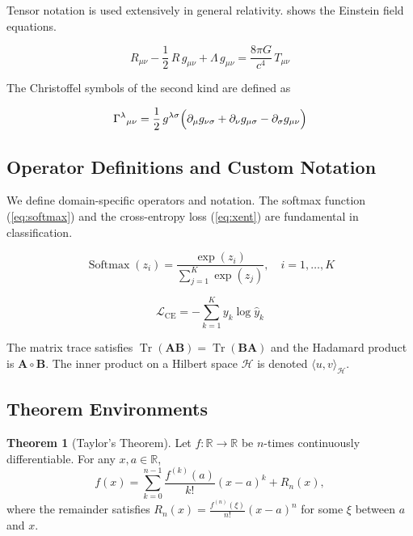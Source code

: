 \documentclass[
    language=english,
    doctype=article,
    institution=none,
    titlestyle=book,
]{../../omnilatex}
\theoremstyle{definition}
\newtheorem{theorem}{Theorem}[section]
\theoremstyle{definition}
\theoremstyle{remark}
\newcommand{\R}{\mathbb{R}}
\DeclareMathOperator{\Tr}{Tr}
\DeclareMathOperator{\Softmax}{Softmax}
\newcommand{\mat}[1]{\mathbf{#1}}
\newcommand{\hyp}{\mathcal{H}}
\newcommand{\inner}[2]{\langle #1, #2 \rangle}
\begin{document}
Tensor notation is used extensively in general relativity.
 shows the Einstein field equations.

\begin{equation}
    \label{eq:einstein}
    R_{\mu\nu} - \frac{1}{2}\,R\,g_{\mu\nu}
        + \Lambda\, g_{\mu\nu}
        = \frac{8\pi G}{c^4}\, T_{\mu\nu}
\end{equation}

The Christoffel symbols of the second kind are defined as

\begin{equation}
    \label{eq:christoffel}
    \Gamma^{\lambda}{}_{\mu\nu}
        = \frac{1}{2}\,g^{\lambda\sigma}
          \Bigl(
              \partial_\mu g_{\nu\sigma}
              + \partial_\nu g_{\mu\sigma}
              - \partial_\sigma g_{\mu\nu}
          \Bigr)
\end{equation}


\subsection{Operator Definitions and Custom Notation}
\label{sec:operators}

We define domain-specific operators and notation.
The softmax function (\cref{eq:softmax}) and the cross-entropy loss
(\cref{eq:xent}) are fundamental in classification.

\begin{equation}
    \label{eq:softmax}
    \Softmax(z_i)
        = \frac{\exp(z_i)}{\sum_{j=1}^{K}\exp(z_j)},
        \quad i = 1, \ldots, K
\end{equation}

\begin{equation}
    \label{eq:xent}
    \mathcal{L}_{\text{CE}}
        = -\sum_{k=1}^{K} y_k \log \hat{y}_k
\end{equation}

The matrix trace satisfies \(\Tr(\mat{A}\mat{B}) = \Tr(\mat{B}\mat{A})\) and the
Hadamard product is \(\mat{A} \circ \mat{B}\).
The inner product on a Hilbert space \(\hyp\) is denoted
\(\inner{u}{v}_{\hyp}\).


\subsection{Theorem Environments}
\label{sec:theorems}

\begin{theorem}[Taylor's Theorem]
    \label{thm:taylor}
    Let \(f \colon \R \to \R\) be \(n\)-times continuously differentiable.
    For any \(x, a \in \R\),
    \begin{equation}
        f(x) = \sum_{k=0}^{n-1}
            \frac{f^{(k)}(a)}{k!}(x-a)^k
            + R_n(x),
    \end{equation}
    where the remainder satisfies
    \(R_n(x) = \frac{f^{(n)}(\xi)}{n!}(x-a)^n\) for some \(\xi\) between
    \(a\) and \(x\).
\end{theorem}
\end{document}
